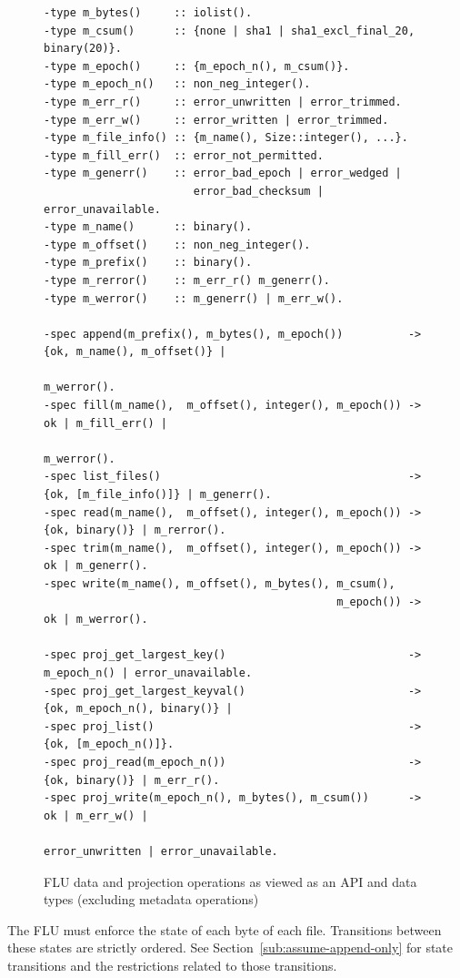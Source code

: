 \documentclass[preprint,10pt]{sigplanconf}
\begin{document}
\begin{figure}[]
\begin{verbatim}
-type m_bytes()     :: iolist().
-type m_csum()      :: {none | sha1 | sha1_excl_final_20, binary(20)}.
-type m_epoch()     :: {m_epoch_n(), m_csum()}.
-type m_epoch_n()   :: non_neg_integer().
-type m_err_r()     :: error_unwritten | error_trimmed.
-type m_err_w()     :: error_written | error_trimmed.
-type m_file_info() :: {m_name(), Size::integer(), ...}.
-type m_fill_err()  :: error_not_permitted.
-type m_generr()    :: error_bad_epoch | error_wedged |
                       error_bad_checksum | error_unavailable.
-type m_name()      :: binary().
-type m_offset()    :: non_neg_integer().
-type m_prefix()    :: binary().
-type m_rerror()    :: m_err_r() m_generr().
-type m_werror()    :: m_generr() | m_err_w().

-spec append(m_prefix(), m_bytes(), m_epoch())          -> {ok, m_name(), m_offset()} |
                                                           m_werror().
-spec fill(m_name(),  m_offset(), integer(), m_epoch()) -> ok | m_fill_err() |
                                                           m_werror().
-spec list_files()                                      -> {ok, [m_file_info()]} | m_generr().
-spec read(m_name(),  m_offset(), integer(), m_epoch()) -> {ok, binary()} | m_rerror().
-spec trim(m_name(),  m_offset(), integer(), m_epoch()) -> ok | m_generr().
-spec write(m_name(), m_offset(), m_bytes(), m_csum(),
                                             m_epoch()) -> ok | m_werror().

-spec proj_get_largest_key()                            -> m_epoch_n() | error_unavailable.
-spec proj_get_largest_keyval()                         -> {ok, m_epoch_n(), binary()} |
-spec proj_list()                                       -> {ok, [m_epoch_n()]}.
-spec proj_read(m_epoch_n())                            -> {ok, binary()} | m_err_r().
-spec proj_write(m_epoch_n(), m_bytes(), m_csum())      -> ok | m_err_w() |
                                                           error_unwritten | error_unavailable. 
\end{verbatim}
\caption{FLU data and projection operations as viewed as an API and data types (excluding metadata operations)}
\label{fig:flu-api}
\end{figure}

The FLU must enforce the state of each byte of each file.
Transitions between these states are strictly ordered.
See Section~\ref{sub:assume-append-only} for state transitions and
the restrictions related to those transitions.
\end{document}
